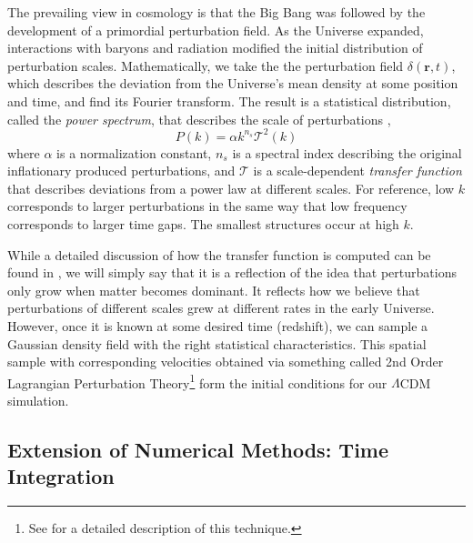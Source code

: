 The prevailing view in cosmology is that the Big Bang was followed by the development of a primordial perturbation field. As the Universe expanded, interactions with baryons and radiation modified the initial distribution of perturbation scales. Mathematically, we take the the perturbation field $\delta(\textbf{r}, t)$, which describes the deviation from the Universe's mean density at some position and time, and find its Fourier transform. The result is a statistical distribution, called the \textit{power spectrum}, that describes the scale of perturbations \citep{music},
\begin{equation}
P(k) = \alpha k^{n_s} \mathcal{T}^2(k)
\end{equation}
where $\alpha$ is a normalization constant, $n_s$ is a spectral index describing the original inflationary produced perturbations, and $\mathcal{T}$ is a scale-dependent \textit{transfer function} that describes deviations from a power law at different scales. For reference, low $k$ corresponds to larger perturbations in the same way that low frequency corresponds to larger time gaps. The smallest structures occur at high $k$.  

While a detailed discussion of how the transfer function is computed can be found in \citet{music}, we will simply say that it is a reflection of the idea that perturbations only grow when matter becomes dominant. It reflects how we believe that perturbations of different scales grew at different rates in the early Universe. However, once it is known at some desired time (redshift), we can sample a Gaussian density field with the right statistical characteristics. This spatial sample with corresponding velocities obtained via something called 2nd Order Lagrangian Perturbation Theory\footnote{See \citet{music} for a detailed description of this technique.} form the initial conditions for our $\Lambda$CDM simulation.

\subsection{Extension of Numerical Methods: Time Integration}

